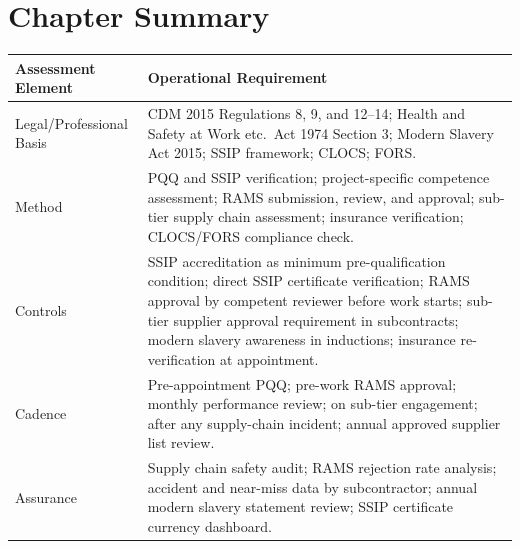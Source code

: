 
\newpage
\section{Chapter Summary}

\begin{table}[H]
\centering
\begin{tabularx}{\textwidth}{>{\raggedright\arraybackslash}p{3.2cm}X}
\toprule
\textbf{Assessment Element} & \textbf{Operational Requirement} \\
\midrule
Legal/Professional Basis & CDM 2015 Regulations 8, 9, and 12--14; Health and Safety at Work etc.\ Act 1974 Section 3; Modern Slavery Act 2015; SSIP framework; CLOCS; FORS. \\
Method & PQQ and SSIP verification; project-specific competence assessment; RAMS submission, review, and approval; sub-tier supply chain assessment; insurance verification; CLOCS/FORS compliance check. \\
Controls & SSIP accreditation as minimum pre-qualification condition; direct SSIP certificate verification; RAMS approval by competent reviewer before work starts; sub-tier supplier approval requirement in subcontracts; modern slavery awareness in inductions; insurance re-verification at appointment. \\
Cadence & Pre-appointment PQQ; pre-work RAMS approval; monthly performance review; on sub-tier engagement; after any supply-chain incident; annual approved supplier list review. \\
Assurance & Supply chain safety audit; RAMS rejection rate analysis; accident and near-miss data by subcontractor; annual modern slavery statement review; SSIP certificate currency dashboard. \\
\bottomrule
\end{tabularx}
\end{table}

